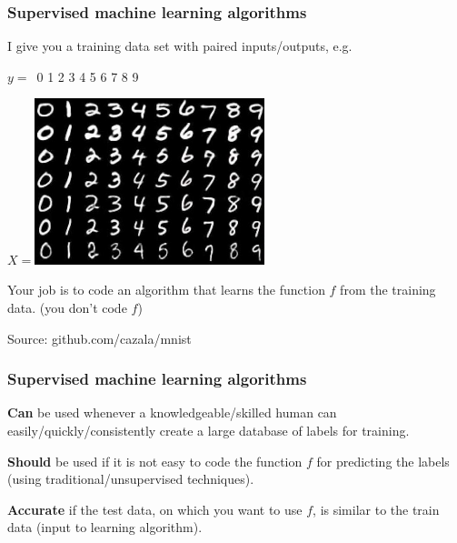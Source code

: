\documentclass{beamer}
\begin{document}
\begin{frame}
  \frametitle{Supervised machine learning algorithms}

  I give you a training data set with paired inputs/outputs, e.g.

  \begin{center}
    \Huge $y=$\ 0 1 2 3 4 5 6 7 8 9

$X=$\includegraphics[height=1.9in]{mnist-digits}
  \end{center}

  Your job is to code an algorithm that learns the function $f$ from
  the training data. (you don't code $f$)
  
  \scriptsize Source: github.com/cazala/mnist
\end{frame}

\begin{frame}
  \frametitle{Supervised machine learning algorithms}

  \textbf{Can} be used whenever a knowledgeable/skilled
  human can easily/quickly/consistently create a large database of
  labels for training.

  \vskip 1cm

  \textbf{Should} be used if it is not easy to code the function $f$
  for predicting the labels (using traditional/unsupervised
  techniques).

  \vskip 1cm

  \textbf{Accurate} if the test data, on which you want to use $f$, is
  similar to the train data (input to learning algorithm).

\end{frame}
\end{document}
